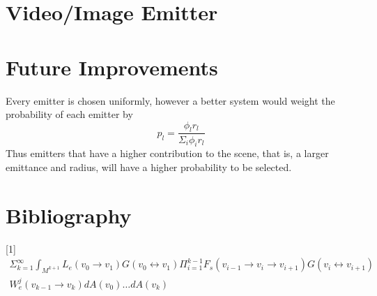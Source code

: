 \documentclass{article}
\begin{document}
  \section{Video/Image Emitter}

  \section{Future Improvements}

  Every emitter is chosen uniformly, however a better system would weight the
  probability of each emitter by
  \[
    p_l = \frac{\phi_lr_l}{\Sigma_i\phi_ir_l}
  \]
  Thus emitters that have a higher contribution to the scene, that is, a larger
  emittance and radius, will have a higher probability to be selected.

 
  
  \section{Bibliography}
  [1]
  \begin{align*}
    \Sigma_{k=1}^{\infty} \int_{M^{k+1}} L_e(v_0 \rightarrow v_1) G(v_0
    \leftrightarrow v_1)
    \Pi_{i=1}^{k-1} F_s(v_{i-1} \rightarrow v_i \rightarrow v_{i+1}) G(v_i
    \leftrightarrow v_{i+1})\\
    W_e^j(v_{k-1} \rightarrow v_k) dA(v_0) \ldots dA(v_k)
  \end{align*}
\end{document}
